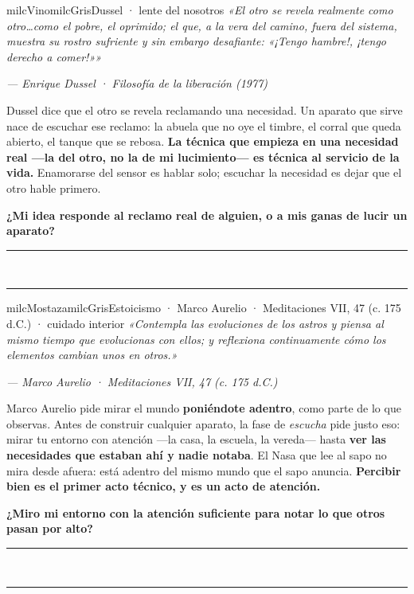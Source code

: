 \documentclass[11pt,letterpaper]{article}
\newcommand{\linead}[1]{\noindent\color{milcLinea}\rule{#1}{0.5pt}\color{milcNegro}}
\begin{document}
\begin{softbox}{milcVino}{milcGris}{Dussel · lente del nosotros}
\textit{«El otro se revela realmente como otro\ldots como el pobre, el oprimido; el que, a la vera del camino, fuera del sistema, muestra su rostro sufriente y sin embargo desafiante: «¡Tengo hambre!, ¡tengo derecho a comer!»»}

{\footnotesize\itshape\color{milcNegro!70}--- Enrique Dussel · Filosofía de la liberación (1977)}

Dussel dice que el otro se revela reclamando una necesidad. Un aparato que sirve nace de escuchar ese reclamo: la abuela que no oye el timbre, el corral que queda abierto, el tanque que se rebosa. \textbf{La técnica que empieza en una necesidad real ---la del otro, no la de mi lucimiento--- es técnica al servicio de la vida.} Enamorarse del sensor es hablar solo; escuchar la necesidad es dejar que el otro hable primero.

\textbf{¿Mi idea responde al reclamo real de alguien, o a mis ganas de lucir un aparato?}
\end{softbox}
\linead{\linewidth}\\[1mm]
\linead{\linewidth}

\begin{softbox}{milcMostaza}{milcGris}{Estoicismo · Marco Aurelio · Meditaciones VII, 47 (c. 175 d.C.) · cuidado interior}
\textit{«Contempla las evoluciones de los astros y piensa al mismo tiempo que evolucionas con ellos; y reflexiona continuamente cómo los elementos cambian unos en otros.»}

{\footnotesize\itshape\color{milcNegro!70}--- Marco Aurelio · Meditaciones VII, 47 (c. 175 d.C.)}

Marco Aurelio pide mirar el mundo \textbf{poniéndote adentro}, como parte de lo que observas. Antes de construir cualquier aparato, la fase de \emph{escucha} pide justo eso: mirar tu entorno con atención ---la casa, la escuela, la vereda--- hasta \textbf{ver las necesidades que estaban ahí y nadie notaba}. El Nasa que lee al sapo no mira desde afuera: está adentro del mismo mundo que el sapo anuncia. \textbf{Percibir bien es el primer acto técnico, y es un acto de atención.}

\textbf{¿Miro mi entorno con la atención suficiente para notar lo que otros pasan por alto?}
\end{softbox}
\linead{\linewidth}\\[1mm]
\linead{\linewidth}
\end{document}
